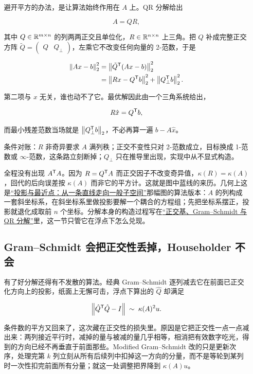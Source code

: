 避开平方的办法，是让算法始终作用在 \(A\) 上。QR 分解给出

\[
A=QR,
\]

其中 \(Q\in\mathbb{R}^{m\times n}\) 的列两两正交且单位化，\(R\in\mathbb{R}^{n\times n}\) 上三角。把 \(Q\) 补成完整正交方阵 \(\tilde Q=\begin{pmatrix}Q&Q_\perp\end{pmatrix}\)，左乘它不改变任何向量的 2-范数，于是

\[
\begin{aligned}
\left\lVert Ax-b\right\rVert_2^2
&=\left\lVert\tilde Q^{\mathsf{T}}(Ax-b)\right\rVert_2^2\\
&=\left\lVert Rx-Q^{\mathsf{T}}b\right\rVert_2^2+\left\lVert Q_\perp^{\mathsf{T}}b\right\rVert_2^2 .
\end{aligned}
\]

第二项与 \(x\) 无关，谁也动不了它。最优解因此由一个三角系统给出，

\[
R\hat x=Q^{\mathsf{T}}b,
\]

而最小残差范数当场就是 \(\left\lVert Q_\perp^{\mathsf{T}}b\right\rVert_2\)，不必再算一遍 \(b-A\hat x\)。

条件对账：\(R\) 非奇异要求 \(A\) 满列秩；正交不变性只对 2-范数成立，目标换成 1-范数或 \(\infty\)-范数，这条路立刻断掉；\(Q_\perp\) 只在推导里出现，实现中从不显式构造。

全程没有出现 \(A^{\mathsf{T}}A\)。因为 \(R=Q^{\mathsf{T}}A\) 而正交因子不改变奇异值，\(\kappa(R)=\kappa(A)\)，回代的后向误差按 \(\kappa(A)\) 而非它的平方计。这就是图中蓝线的来历。几何上这是\hyperref[sec:03-Linear-Algebra/03-Orthogonality/02]{``投影与最近点：从一条直线走向一般子空间''}那幅图的算法版本：\(A\) 的列构成一套斜坐标系，在斜坐标系里做投影要解一个耦合的方程组；先把坐标系摆正，投影就退化成取前 \(n\) 个坐标。分解本身的构造过程写在\hyperref[sec:03-Linear-Algebra/03-Orthogonality/04]{``正交基、Gram--Schmidt 与 QR 分解''}里，这一节只管它在浮点下怎么兑现。

\subsection{Gram--Schmidt 会把正交性丢掉，Householder 不会}

有了好分解还得有不发散的算法。经典 Gram--Schmidt 逐列减去它在前面已正交化方向上的投影，纸面上无懈可击，浮点下算出的 \(\hat Q\) 却满足

\[
\left\lVert\hat Q^{\mathsf{T}}\hat Q-I\right\rVert\;\sim\;\kappa(A)^2u .
\]

条件数的平方又回来了，这次藏在正交性的损失里。原因是它把正交性一点一点减出来：两列接近平行时，减掉的量与被减的量几乎相等，相消把有效数字吃光，得到的方向已经不再垂直于前面那些。Modified Gram--Schmidt 改的只是更新次序，处理完第 \(k\) 列立刻从所有后续列中扣掉这一方向的分量，而不是等轮到某列时一次性扣完前面所有分量；就这一处调整把界降到 \(\kappa(A)u\)。

